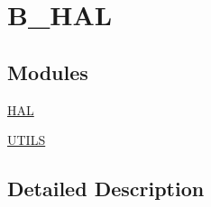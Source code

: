 \hypertarget{group___b___h_a_l}{}\section{B\+\_\+\+H\+AL}
\label{group___b___h_a_l}
\subsection*{Modules}
\begin{DoxyCompactItemize}
\item 
\mbox{\hyperlink{group___h_a_l}{H\+AL}}
\item 
\mbox{\hyperlink{group___u_t_i_l_s}{U\+T\+I\+LS}}
\end{DoxyCompactItemize}


\subsection{Detailed Description}
